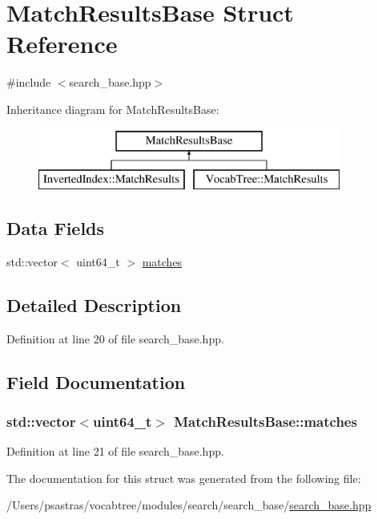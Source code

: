 \hypertarget{structMatchResultsBase}{\section{Match\-Results\-Base Struct Reference}
\label{structMatchResultsBase}
}


{\ttfamily \#include $<$search\-\_\-base.\-hpp$>$}

Inheritance diagram for Match\-Results\-Base\-:\begin{figure}[H]
\begin{center}
\leavevmode
\includegraphics[height=2.000000cm]{structMatchResultsBase}
\end{center}
\end{figure}
\subsection*{Data Fields}
\begin{DoxyCompactItemize}
\item 
std\-::vector$<$ uint64\-\_\-t $>$ \hyperlink{structMatchResultsBase_aba6a7554c61bf5f8429120c58c97606b}{matches}
\end{DoxyCompactItemize}


\subsection{Detailed Description}


Definition at line 20 of file search\-\_\-base.\-hpp.



\subsection{Field Documentation}
\hypertarget{structMatchResultsBase_aba6a7554c61bf5f8429120c58c97606b}{
\subsubsection[{matches}]{\setlength{\rightskip}{0pt plus 5cm}std\-::vector$<$uint64\-\_\-t$>$ Match\-Results\-Base\-::matches}}\label{structMatchResultsBase_aba6a7554c61bf5f8429120c58c97606b}


Definition at line 21 of file search\-\_\-base.\-hpp.



The documentation for this struct was generated from the following file\-:\begin{DoxyCompactItemize}
\item 
/\-Users/psastras/vocabtree/modules/search/search\-\_\-base/\hyperlink{search__base_8hpp}{search\-\_\-base.\-hpp}\end{DoxyCompactItemize}
